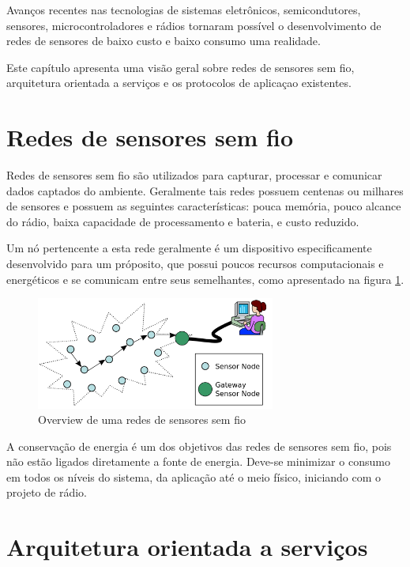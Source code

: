 Avan\c{c}os recentes nas tecnologias de sistemas eletr\^onicos, semicondutores, sensores, microcontroladores e r\'adios tornaram poss\'ivel o desenvolvimento de redes de sensores de baixo custo e baixo consumo uma realidade.

Este cap\'itulo apresenta uma vis\~ao geral sobre redes de sensores sem fio, arquitetura orientada a servi\c{c}os e os protocolos de aplica\c{c}ao existentes.

\section{Redes de sensores sem fio}

Redes de sensores sem fio s\~ao utilizados para capturar, processar e comunicar dados captados do ambiente. Geralmente tais redes possuem centenas ou milhares de sensores e possuem as seguintes caracter\'isticas: pouca mem\'oria, pouco alcance do r\'adio, baixa capacidade de processamento e bateria, e custo reduzido.

Um n\'o pertencente a esta rede geralmente \'e um dispositivo especificamente desenvolvido para um pr\'oposito, que possui poucos recursos computacionais e energ\'eticos e se comunicam entre seus semelhantes, como apresentado na figura \ref{wsnOverview}.
\begin{figure}[h]
   \label{wsnOverview}
   \centering
   \includegraphics[width=0.7\textwidth]{figuras/wsn.png}
   \caption{Overview de uma redes de sensores sem fio}
\end{figure}

A conserva\c{c}\~ao de energia \'e um dos objetivos das redes de sensores sem fio, pois n\~ao est\~ao ligados diretamente a fonte de energia. Deve-se minimizar o consumo em todos os n\'iveis do sistema, da aplica\c{c}\~ao at\'e o meio f\'isico, iniciando com o projeto de r\'adio. \cite{WsnSurvey2008} 


\section{Arquitetura orientada a servi\c{c}os}

